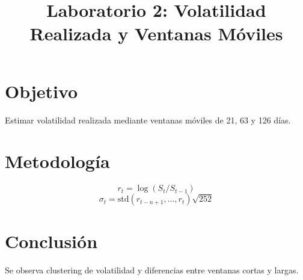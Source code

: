 \documentclass[12pt]{article}
\begin{document}
\title{Laboratorio 2: Volatilidad Realizada y Ventanas Móviles}
\maketitle
\section{Objetivo}
Estimar volatilidad realizada mediante ventanas móviles de 21, 63 y 126 días.
\section{Metodología}
\[ r_t=\log(S_t/S_{t-1}) \]
\[ \sigma_t=\mathrm{std}(r_{t-n+1},...,r_t)\sqrt{252} \]
\section{Conclusión}
Se observa clustering de volatilidad y diferencias entre ventanas cortas y largas.
\end{document}
